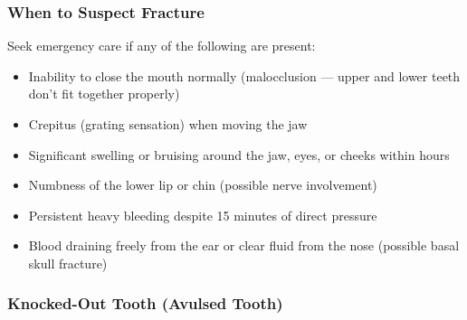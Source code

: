 \subsubsection{When to Suspect Fracture}

Seek emergency care if any of the following are present:
\begin{itemize}[leftmargin=*]
  \item Inability to close the mouth normally (malocclusion — upper and lower teeth don't fit together properly)
  \item Crepitus (grating sensation) when moving the jaw
  \item Significant swelling or bruising around the jaw, eyes, or cheeks within hours
  \item Numbness of the lower lip or chin (possible nerve involvement)
  \item Persistent heavy bleeding despite 15 minutes of direct pressure
  \item Blood draining freely from the ear or clear fluid from the nose (possible basal skull fracture)
\end{itemize}

\subsubsection{Knocked-Out Tooth (Avulsed Tooth)}

